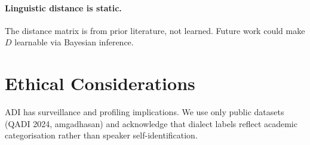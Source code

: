 \documentclass[11pt,a4paper,twocolumn]{article}
\begin{document}
\paragraph{Linguistic distance is static.}
The distance matrix is from prior literature, not learned. Future
work could make $D$ learnable via Bayesian inference.

\section{Ethical Considerations}
ADI has surveillance and profiling implications. We use only
public datasets (QADI 2024, amgadhasan) and acknowledge that
dialect labels reflect academic categorisation rather than speaker
self-identification.



\end{document}
